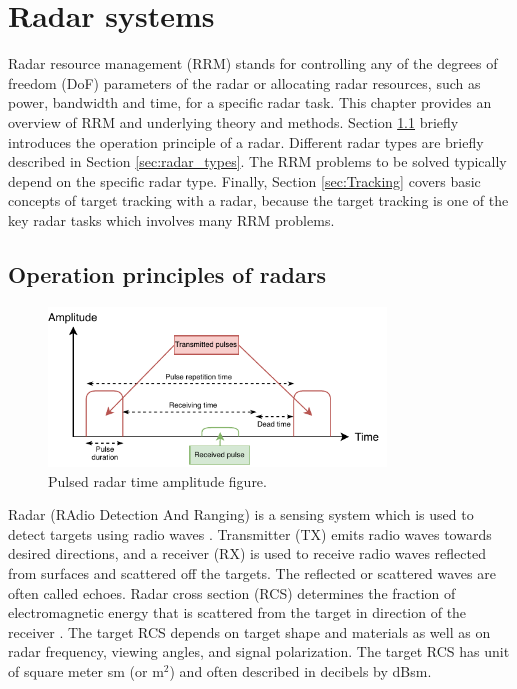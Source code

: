 \documentclass[english, 12pt, a4paper, elec, utf8, a-1b, online]{aaltothesis}
\begin{document}
\clearpage
\section{Radar systems}\label{sec:background}

Radar resource management (RRM) stands for controlling any of the degrees of freedom (DoF) parameters of the radar or allocating radar resources, such as power, bandwidth and time, for a specific radar task.
This chapter provides an overview of RRM and underlying theory and methods.
Section \ref{sec:radar_opertaion_principle} briefly introduces the operation principle of a radar.
Different radar types are briefly described in Section \ref{sec:radar_types}. 
The RRM problems to be solved typically depend on the specific radar type. 
Finally, Section \ref{sec:Tracking} covers basic concepts of target tracking with a radar, because the target tracking is one of the key radar tasks which involves many RRM problems.

\subsection{Operation principles of radars} \label{sec:radar_opertaion_principle}

\begin{figure}[htb]
    \centering
    \includegraphics[width=0.8\textwidth]{figures/background/pulsed_radar.pdf}
    \caption{Pulsed radar time amplitude figure.}
    \label{fig:pulsed_radar}
\end{figure}

Radar (RAdio Detection And Ranging) is a sensing system which is used to detect targets using radio waves \cite{Curry2011}.
Transmitter (TX) emits radio waves towards desired directions, and a receiver (RX) is used to receive radio waves reflected from surfaces and scattered off the targets. 
The reflected or scattered waves are often called echoes.
Radar cross section (RCS) determines the fraction of electromagnetic energy that is scattered from the target in direction of the receiver \cite{Curry2011}.
The target RCS depends on target shape and materials as well as on radar frequency, viewing angles, and signal polarization.
The target RCS has unit of square meter sm (or m$^2$) and often described in decibels by dBsm.
\end{document}
